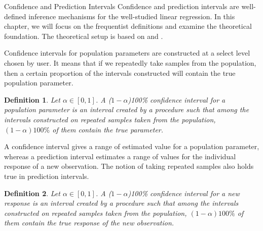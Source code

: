 \documentclass[12pt]{pom_thesis}
\newtheorem{definition}{Definition}[section]
\begin{document}
\begin{chapter}{Confidence and Prediction Intervals}
Confidence and prediction intervals are well-defined inference mechanisms for the well-studied linear regression. In this chapter, we will focus on the frequentist definitions and examine the theoretical foundation. The theoretical setup is based on \cite{ISLR} and \cite{Neter1996}. 

Confidence intervals for population parameters are constructed at a select level chosen by user. It means that if we repeatedly take samples from the population, then a certain proportion of the intervals constructed will contain the true population parameter.

\begin{definition}
Let $\alpha \in [0,1]$. A ($1-\alpha$)100\% confidence interval for a population parameter is an interval created by a procedure such that among the intervals constructed on repeated samples taken from the population, $(1-\alpha)100\%$ of them contain the true parameter. 
\end{definition}

A confidence interval gives a range of estimated value for a population parameter, whereas a prediction interval estimates a range of values for the individual response of a new observation. The notion of taking repeated samples also holds true in prediction intervals.

\begin{definition}
Let $\alpha \in [0,1]$. A ($1-\alpha$)100\% confidence interval for a new response is an interval created by a procedure such that among the intervals constructed on repeated samples taken from the population, $(1-\alpha)100\%$ of them contain the true response of the new observation. 
\end{definition}


\end{chapter}
\end{document}

